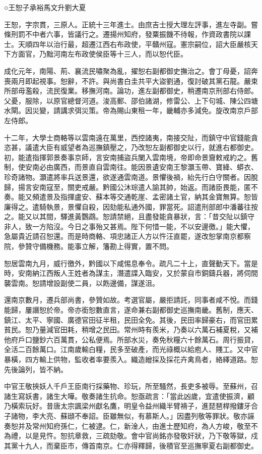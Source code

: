 
\begin{pinyinscope}
○王恕子承裕馬文升劉大夏

王恕，字宗貫，三原人。正統十三年進士。由庶吉士授大理左評事，進左寺副。嘗條刑罰不中者六事，皆議行之。遷揚州知府，發粟振饑不待報，作資政書院以課士。天順四年以治行最，超遷江西右布政使，平贛州寇。憲宗嗣位，詔大臣嚴核天下方面官，乃黜河南左布政使侯臣等十三人，而以恕代臣。

成化元年，南陽、荊、襄流民嘯聚為亂，擢恕右副都御史撫治之。會丁母憂，詔奔喪兩月即起視事。恕辭，不許。與尚書白圭共平大盜劉通，復討破其黨石龍。嚴束所部毋濫殺，流民復業。移撫河南。論功，進左副都御史，稍遷南京刑部右侍郎。父憂，服除，以原官總督河道。浚高郵、邵伯諸湖，修雷公、上下句城、陳公四塘水閘。因災變，請講求弭災策。帝為賜山東租一年，畿輔亦多減免。旋改南京戶部左侍郎。

十二年，大學士商輅等以雲南遠在萬里，西控諸夷，南接交阯，而鎮守中官錢能貪恣甚，議遣大臣有威望者為巡撫鎮壓之，乃改恕左副都御史以行，就進右都御史。初，能遣指揮郭景奏事京師，言安南捕盜兵闌入雲南境，帝即命景齎敕戒約之。舊制，使安南必由廣西，而景直自雲南往。能因景遺安南王黎灝玉帶、寶絳、蟒衣、珍奇諸物。灝遣將率兵送景還，欲遂通雲南道。景懼後禍，紿先行白守關者。因脫歸，揚言安南寇至，關吏戒嚴。黔國公沐琮遣人諭其帥，始返。而諸臣畏能，匿不奏。能又頻遣景及指揮盧安、蘇本等交通乾崖、孟密諸土官，納其金寶無算。恕皆廉得之。遣騎執景，景懼自殺，因劾能私通外國，罪當死。詔遣刑部郎中潘蕃往按之。能又以其間，驛進黃鸚鵡。恕請禁絕，且盡發能貪暴狀，言：「昔交阯以鎮守非人，致一方陷沒。今日之事殆又甚焉。陛下何惜一能，不以安邊徼。」能大懼，急屬貴近請召恕還。而是時商輅、項忠諸正人方以忤汪直罷，遂改恕掌南京都察院，參贊守備機務。能事立解，籓勘上得實，置不問。

恕居雲南九月，威行徼外，黔國以下咸惕息奉令。疏凡二十上，直聲動天下。當是時，安南納江西叛人王姓者為謀主，潛遣諜入臨安，又於蒙自市銅鑄兵器，將伺間襲雲南。恕請增設副使二員，以飭邊備，謀遂沮。

還南京數月，遷兵部尚書，參贊如故。考選官屬，嚴拒請託，同事者咸不悅。而錢能歸，屢譖恕於帝。帝亦銜恕數直言，遂命兼右副都御史巡撫南畿。舊制，應天、鎮江、太平、寧國、廣德官田征半租，民田全免。其後，民田率歸豪右，而官田累貧民。恕乃量減官田耗，稍增之民田。常州時有羨米，乃奏以六萬石補夏稅，又補他府戶口鹽鈔六百萬貫，公私便焉。所部水災，奏免秋糧六十餘萬石。周行振貸，全活二百餘萬口。江南歲輸白糧，民多至破產，而光祿概以給庖人、賤工。又中官暴橫，四方輸上供物，監收者率要羨入。織造繒採及採花卉禽鳥者，絡繹道路。恕先後論列，皆不納。

中官王敬挾妖人千戶王臣南行採藥物、珍玩，所至騷然，長吏多被辱。至蘇州，召諸生寫妖書，諸生大嘩。敬奏諸生抗命。恕亟疏言：「當此凶歲，宜遣使振濟，顧乃橫索玩好。昔唐太宗諷梁州獻名鷹，明皇令益州織半臂褙子，進琵琶桿撥鏤牙合子諸物，李大亮、蘇頲不奉詔。臣雖無似，有慕斯人。」因盡列敬等罪狀。敬亦誣奏恕并及常州知府孫仁，仁被逮。仁，新淦人，由進士歷知府，為人方峻，敬至不為禮，以是見忤。恕抗章救，三疏劾敬。會中官尚銘亦發敬奸狀，乃下敬等獄，戍其黨十九人，而棄臣市，傳首南京。仁亦得釋歸，後積官至巡撫寧夏右副都御史。


\end{pinyinscope}
